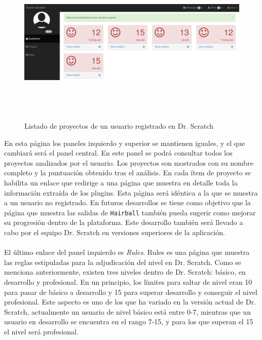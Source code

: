 \documentclass[a4paper, 12pt]{book}
\begin{document}
\begin{figure} [h]
  \centering
	\graphicspath{{img/}}
  \includegraphics[bb=0 0 800 600, width=18cm, height=8cm, keepaspectratio]{proyectos.png}
	\caption{Listado de proyectos de un usuario registrado en Dr. Scratch}
  \label{figura:foro_hilos}
\end{figure}


En esta página los paneles izquierdo y superior se mantienen iguales, y el que cambiará será
el panel central. En este panel se podrá consultar todos los proyectos analizados por el usuario. 
Los proyectos son mostrados con su nombre completo y la puntuación obtenido tras el análisis. 
En cada ítem de proyecto se habilita un enlace que redirige a una página que muestra en detalle
toda la información extraída de los plugins. Esta página será idéntica a la que se muestra a un
usuario no registrado. En futuros desarrollos se tiene como objetivo que la página que muestra
las salidas de \texttt{Hairball} también pueda sugerir como mejorar su progresión dentro de la
plataforma. Este desarrollo también será llevado a cabo por el equipo Dr. Scratch en versiones
superiores de la aplicación.  \\ \\ 


El último enlace del panel izquierdo es \emph{Rules}. Rules es una página que muestra
las reglas estipuladas para la adjudicación del nivel en Dr. Scratch. Como se menciona
anteriormente, existen tres niveles dentro de Dr. Scratch: básico, en desarrollo y 
profesional. En un principio, los límites para saltar de nivel eran 10 para pasar de 
básico a desarrollo y 15 para superar desarrollo y conseguir el nivel profesional. Este
aspecto es uno de los que ha variado en la versión actual de Dr. Scratch, actualmente
un usuario de nivel básico está entre 0-7, mientras que un usuario en desarrollo se
encuentra en el rango 7-15, y para los que superan el 15 el nivel será profesional.
\end{document}
